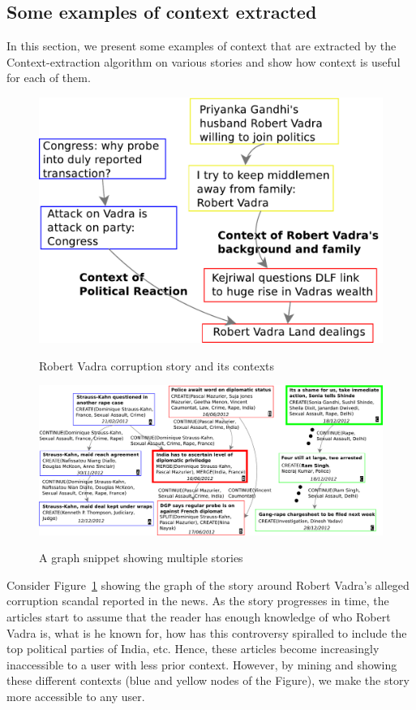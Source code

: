 \subsection{Some examples of context extracted}
In this section, we present some examples of context that are extracted by the Context-extraction algorithm on various stories and show how context is useful for each of them.

\begin{figure}
\caption{Robert Vadra corruption story and its contexts}
\includegraphics[scale=0.30]{figures/graph-vadra.pdf}
\label{fig:vadra-corruption}
\end{figure}
\begin{figure}[ht]
\caption{A graph snippet showing multiple stories}
\includegraphics[scale=0.34]{figures/graph-2.pdf}
\label{fig:context-graph-example}
\end{figure}
Consider Figure~\ref{fig:vadra-corruption} showing the graph of the story around Robert Vadra's alleged
corruption scandal reported in the news. As the story progresses in time, the articles
start to assume that the reader has enough knowledge of who Robert Vadra is, what is he known for,
how has this controversy spiralled to include the top political parties of India, etc. Hence, these articles
become increasingly inaccessible to a user with less prior context. However, 
by mining and showing these different contexts (blue and yellow nodes of the Figure), we make the story more accessible to any user. 



